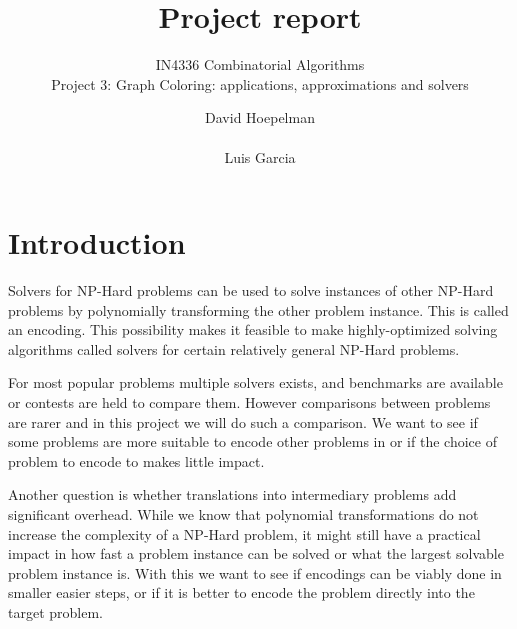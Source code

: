 \documentclass{sig-alternate}
\begin{document}
\title{Project report}

\subtitle{IN4336 Combinatorial Algorithms\\Project 3: Graph Coloring: applications, approximations and
solvers}


\author{
\alignauthor
David Hoepelman\\
       \\
\alignauthor
Luis Garcia\\
}

\maketitle


\begin{abstract}

\end{abstract}


\section{Introduction}

Solvers for NP-Hard problems can be used to solve instances of other NP-Hard problems by polynomially transforming the other problem instance. This is called an encoding.
This possibility makes it feasible to make highly-optimized solving algorithms called solvers for certain relatively general NP-Hard problems.

For most popular problems multiple solvers exists, and benchmarks are available or contests are held to compare them.
However comparisons between problems are rarer and in this project we will do such a comparison.
We want to see if some problems are more suitable to encode other problems in or if the choice of problem to encode to makes little impact.

Another question is whether translations into intermediary problems add significant overhead.
While we know that polynomial transformations do not increase the complexity of a NP-Hard problem, it might still have a practical impact in how fast a problem instance can be solved or what the largest solvable problem instance is.
With this we want to see if encodings can be viably done in smaller easier steps, or if it is better to encode the problem directly into the target problem.
\end{document}

